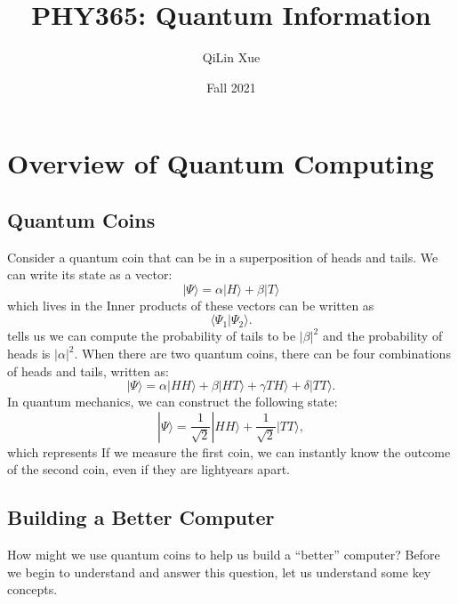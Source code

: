 \documentclass{article}
\title{PHY365: Quantum Information}
\author{QiLin Xue}
\date{Fall 2021}
\numberwithin{equation}{section}
\begin{document}
\maketitle
\tableofcontents
\newpage
\section{Overview of Quantum Computing}
\subsection{Quantum Coins}
Consider a quantum coin that can be in a superposition of heads and tails. We can write its state as a vector:
\begin{equation}
    |\Psi\rangle = \alpha|H\rangle + \beta|T\rangle  
\end{equation}
which lives in the  Inner products of these vectors can be written as 
\begin{equation}
    \langle \Psi_1 | \Psi_2 \rangle.
\end{equation}
 tells us we can compute the probability of tails to be $|\beta|^2$ and the probability of heads is $|\alpha|^2$. When there are two quantum coins, there can be four combinations of heads and tails, written as:
\begin{equation}
    |\Psi\rangle = \alpha|HH\rangle + \beta|HT\rangle + \gamma TH\rangle + \delta |TT\rangle.
\end{equation}
In quantum mechanics, we can construct the following state:
\begin{equation}
    |\Psi\rangle = \frac{1}{\sqrt{2}}|HH\rangle + \frac{1}{\sqrt{2}}|TT\rangle,
\end{equation}
which represents  If we measure the first coin, we can instantly know the outcome of the second coin, even if they are lightyears apart.
\subsection{Building a Better Computer}
How might we use quantum coins to help us build a ``better'' computer? Before we begin to understand and answer this question, let us understand some key concepts.
\end{document}
